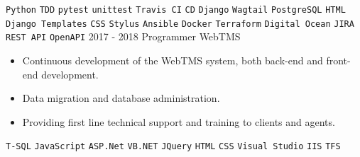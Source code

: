 \documentclass[9pt]{developercv} %
\begin{document}
\begin{entrylist}
{        \texttt{Python} \slashsep \texttt{TDD} \slashsep \texttt{pytest} \slashsep \texttt{unittest} \slashsep \texttt{Travis CI} \slashsep \texttt{CD} \slashsep \texttt{Django} \slashsep \texttt{Wagtail} \slashsep \texttt{PostgreSQL} \slashsep \texttt{HTML} \slashsep \texttt{Django Templates} \slashsep \texttt{CSS} \slashsep \texttt{Stylus} \slashsep \texttt{Ansible} \slashsep \texttt{Docker} \slashsep \texttt{Terraform} \slashsep \texttt{Digital Ocean} \slashsep \texttt{JIRA} \slashsep \texttt{REST API} \slashsep \texttt{OpenAPI}}
	\entry
		{2017 - 2018}
		{Programmer}
		{WebTMS}
		{\vspace{-10pt}
        \begin{itemize}[noitemsep,topsep=0pt,parsep=0pt,partopsep=0pt, leftmargin=-1pt]
            \item Continuous development of the WebTMS system, both back-end and front-end development. 
            \item Data migration and database administration.
            \item Providing first line technical support and training to clients and agents.
        \end{itemize} 
        \texttt{T-SQL} \slashsep \texttt{JavaScript} \slashsep \texttt{ASP.Net} \slashsep \texttt{VB.NET} \slashsep \texttt{JQuery} \slashsep \texttt{HTML} \slashsep \texttt{CSS} \slashsep \texttt{Visual Studio} \slashsep \texttt{IIS} \slashsep \texttt{TFS}}

\end{entrylist}
\end{document}
